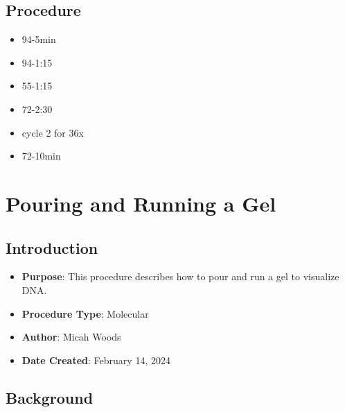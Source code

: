 \documentclass[
  letterpaper,
  DIV=11,
  numbers=noendperiod]{scrreprt}
\providecommand{\tightlist}{%
  \setlength{\itemsep}{0pt}\setlength{\parskip}{0pt}}\usepackage{longtable,booktabs,array}
\begin{document}
\hypertarget{procedure-21}{%
\section{Procedure}\label{procedure-21}}

\begin{itemize}
\tightlist
\item
  94-5min
\item
  94-1:15
\item
  55-1:15
\item
  72-2:30
\item
  cycle 2 for 36x
\item
  72-10min
\end{itemize}

\hypertarget{sec-molecular-gel}{%
\chapter{Pouring and Running a Gel}\label{sec-molecular-gel}}

\hypertarget{introduction-22}{%
\section{Introduction}\label{introduction-22}}

\begin{itemize}
\tightlist
\item
  \textbf{Purpose}: This procedure describes how to pour and run a gel
  to visualize DNA.
\item
  \textbf{Procedure Type}: Molecular
\item
  \textbf{Author}: Micah Woods
\item
  \textbf{Date Created}: February 14, 2024
\end{itemize}

\hypertarget{background-2}{%
\section{Background}\label{background-2}}
\end{document}
